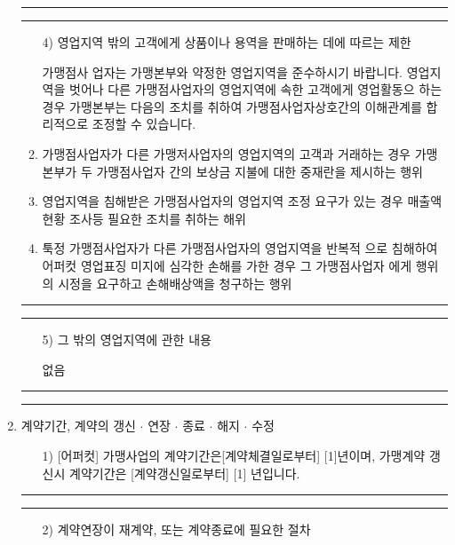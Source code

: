 \documentclass[a5paper,10pt]{oblivoir}
\newcommand\crule[3][black]{\textcolor{#1}{\rule{#2}{#3}}}
\begin{document}
\begin{enumerate}
\newpage
\begin{center}
\crule[red]{4cm}{0.1cm} \crule[blue]{4cm}{0.1cm}
\end{center}
\begin{enumerate}
\item[4)] 영업지역 밖의 고객에게 상품이나 용역을 판매하는 데에 따르는 제한

가맹점사 업자는 가맹본부와 약정한 영업지역을 준수하시기 바랍니다. 영업지역을 벗어나 다른 가맹점사업자의 영업지역에 속한 고객에게 영업활동으 하는 경우 가맹본부는 다음의 조치를 취하여 가맹점사업자상호간의 이해관계를 합리적으로 조정할 수 있습니다.
\item 가맹점사업자가 다른 가맹저사업자의 영업지역의 고객과 거래하는 경우 가맹본부가 두 가맹점사업자 간의 보상금 지불에 대한 중재란을 제시하는 행위
\item
 영업지역을 침해받은 가맹점사업자의 영업지역 조정 요구가 있는 경우 매출액 현황 조사등 필요한 조치를 취하는 해위
\item
 툭정 가맹점사업자가 다른 가맹점사업자의 영업지역을 반복적 으로 침해하여 어퍼컷 영업표징 미지에 심각한 손해를 가한 경우 그 가맹점사업자 에게 행위의 시정을 요구하고 손해배상액을 청구하는 행위
\end{enumerate}

\newpage
\begin{center}
\crule[red]{4cm}{0.1cm} \crule[blue]{4cm}{0.1cm}
\end{center}
\begin{enumerate}
\item[5)] 그 밖의 영업지역에 관한 내용

 없음
\end{enumerate}
\newpage
\begin{center}
\crule[red]{4cm}{0.1cm} \crule[blue]{4cm}{0.1cm}
\end{center}
\item 계약기간, 계약의 갱신 $\cdot$ 연장 $\cdot$ 종료 $\cdot$ 해지 $\cdot$ 수정
\begin{enumerate}
\item[1)] [어퍼컷] 가맹사업의 계약기간은[계약체결일로부터] [1]년이며, 가맹계약 갱신시 계약기간은 [계약갱신일로부터] [1] 년입니다.
\end{enumerate}

\newpage
\begin{center}
\crule[red]{4cm}{0.1cm} \crule[blue]{4cm}{0.1cm}
\end{center}
\begin{enumerate}
\item[2)] 계약연장이 재계약, 또는 계약종료에 필요한 절차


\end{enumerate}
\end{enumerate}
\end{document}

